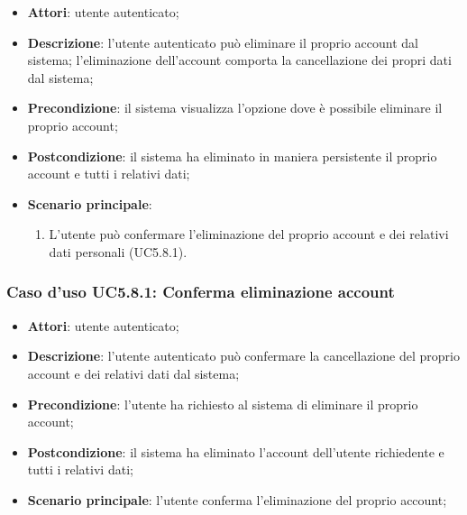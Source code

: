 \begin{itemize}
	\item \textbf{Attori}: utente autenticato;
	\item \textbf{Descrizione}: l'utente autenticato può eliminare il proprio account dal sistema; l'eliminazione dell'account comporta la cancellazione dei propri dati dal sistema; 
	\item \textbf{Precondizione}: il sistema visualizza l'opzione dove è possibile eliminare il proprio account;
	\item \textbf{Postcondizione}: il sistema ha eliminato in maniera persistente il proprio account e tutti i relativi dati;
	\item \textbf{Scenario principale}:
		\begin{enumerate}
			\item L'utente può confermare l'eliminazione del proprio account e dei relativi dati personali (UC5.8.1).
		\end{enumerate}
\end{itemize}

\subsubsection{Caso d'uso UC5.8.1: Conferma eliminazione account}

\begin{itemize}
	\item \textbf{Attori}: utente autenticato;
	\item \textbf{Descrizione}: l'utente autenticato può confermare la cancellazione del proprio account e dei relativi dati dal sistema;
	\item \textbf{Precondizione}: l'utente ha richiesto al sistema di eliminare il proprio account;
	\item \textbf{Postcondizione}: il sistema ha eliminato l'account dell'utente richiedente e tutti i relativi dati;
	\item \textbf{Scenario principale}: l'utente conferma l'eliminazione del proprio account;
\end{itemize}